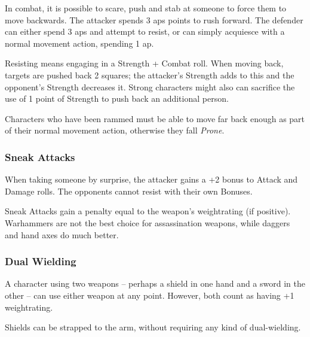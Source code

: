 \begin{multicols}{2}
In combat, it is possible to scare, push and stab at someone to force them to move backwards.
The attacker spends 3 \glspl{ap} points to rush forward.
The defender can either spend 3 \glspl{ap} and attempt to resist, or can simply acquiesce with a normal movement action, spending 1 \gls{ap}.

Resisting means engaging in a Strength + Combat roll.
When moving back, targets are pushed back 2 squares; the attacker's Strength adds to this and the opponent's Strength decreases it.
Strong characters might also can sacrifice the use of 1 point of Strength to push back an additional person.

Characters who have been rammed must be able to move far back enough as part of their normal movement action, otherwise they fall \textit{Prone}.

\subsubsection[Sneak Attack: +2 to attack and +2 Damage. Surprised enemies cannot resist.]{Sneak Attacks}
\label{sneakattack}

When taking someone by surprise, the attacker gains a +2 bonus to Attack and Damage rolls.
The opponents cannot resist with their own Bonuses.

Sneak Attacks gain a penalty equal to the weapon's \gls{weightrating} (if positive).
Warhammers are not the best choice for assassination weapons, while daggers and hand axes do much better.

\subsubsection[Dual Wielding: Both weapons count has having +1 \glsentrytext{weightrating}]{Dual Wielding}

A character using two weapons -- perhaps a shield in one hand and a sword in the other -- can use either weapon at any point.
However, both count as having +1 \gls{weightrating}.

Shields can be strapped to the arm, without requiring any kind of dual-wielding.

\stopcontents[Manoeuvres]

\end{multicols}

